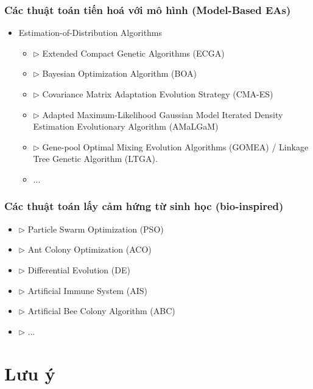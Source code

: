\documentclass{book}
\begin{document}
\subsubsection{Các thuật toán tiến hoá với mô hình (Model-Based EAs)}

\begin{itemize}
    \item Estimation-of-Distribution Algorithms
    \begin{itemize}
        \item[] $\triangleright$ Extended Compact Genetic Algorithms (ECGA)
        \item[] $\triangleright$ Bayesian Optimization Algorithm (BOA)
        \item[] $\triangleright$ Covariance Matrix Adaptation Evolution Strategy (CMA-ES)
        \item[] $\triangleright$ Adapted Maximum-Likelihood Gaussian Model Iterated Density Estimation Evolutionary Algorithm (AMaLGaM)
        \item[] $\triangleright$ Gene-pool Optimal Mixing Evolution Algorithms (GOMEA) / Linkage Tree Genetic Algorithm (LTGA).
        \item ...
    \end{itemize}
\end{itemize}

\subsubsection{Các thuật toán lấy cảm hứng từ sinh học (bio-inspired)}

\begin{itemize}
    \item[] $\triangleright$ Particle Swarm Optimization (PSO)
    \item[] $\triangleright$ Ant Colony Optimization (ACO)
    \item[] $\triangleright$ Differential Evolution (DE)
    \item[] $\triangleright$ Artificial Immune System (AIS)
    \item[] $\triangleright$ Artificial Bee Colony Algorithm (ABC)
    \item[] $\triangleright$ ...
\end{itemize}

\section*{Lưu ý} %
\end{document}
